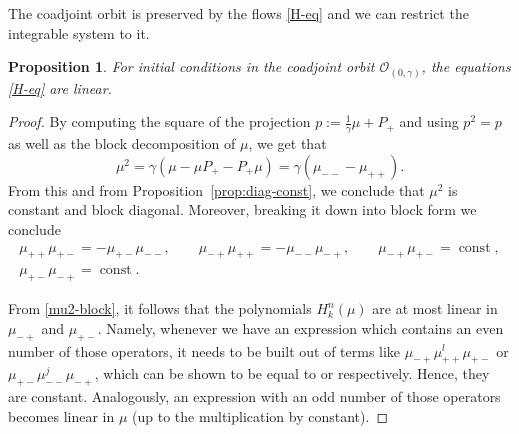\documentclass[10pt,a4paper]{amsart}
\newtheorem{prop}[thm]{Proposition}
\theoremstyle{definition}
\numberwithin{equation}{section}
\DeclareMathOperator{\const}{const}
\newcommand{\be}{\begin{equation}}
\newcommand{\ee}{\end{equation}}
\begin{document}
The coadjoint orbit is preserved by the flows \eqref{H-eq} and we can restrict the integrable system to it.

\begin{prop}\label{prop:mu-linear}
For initial conditions in the coadjoint orbit $\mathcal O_{(0,\gamma)}$, the equations \eqref{H-eq} are linear.
\end{prop}

\begin{proof}
By computing the square of the projection $p:= \frac{1}{\gamma}\mu + P_+$ and using $p^2 = p$ as well as the block decomposition of $\mu$, we get that
\be \label{mu2} \mu^2 = \gamma (\mu-\mu P_+ - P_+\mu) = \gamma(\mu_{--}-\mu_{++}).\ee
From this and from Proposition~\ref{prop:diag-const}, we conclude that $\mu^2$ is constant and block diagonal. Moreover, breaking it down into block form we conclude
\begin{gather}\label{mu2-block}
\mu_{++} \mu_{+-} = - \mu_{+-}\mu_{--},\qquad
\mu_{-+} \mu_{++} = - \mu_{--}\mu_{-+},\qquad
\mu_{-+}\mu_{+-} = \const,\nonumber\\
\mu_{+-}\mu_{-+} = \const.
\end{gather}

From \eqref{mu2-block}, it follows that the polynomials $H^n_k(\mu)$ are at most linear in $\mu_{-+}$ and $\mu_{+-}$. Namely, whenever we have an expression which contains an even number of those operators, it needs to be built out of terms like $\mu_{-+}\mu_{++}^l\mu_{+-}$ or $\mu_{+-}\mu_{--}^j\mu_{-+}$, which can be shown to be equal to  or  respectively. Hence, they are constant. Analogously, an expression with an odd number of those operators becomes linear in $\mu$ (up to the multiplication by constant).
\end{proof}
\end{document}
